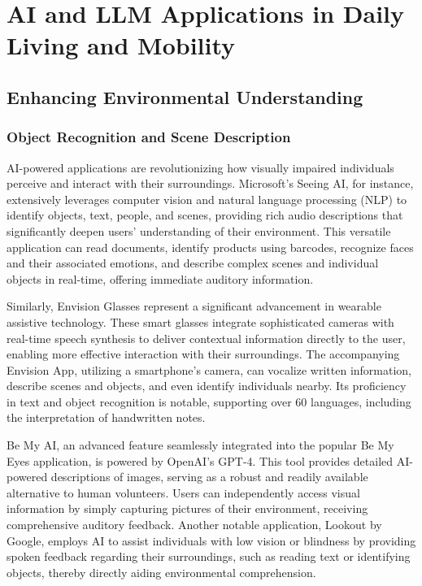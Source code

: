 \section{AI and LLM Applications in Daily Living and Mobility}
\label{sec:ai-llm-applications-daily-living}

\subsection{Enhancing Environmental Understanding}
\label{subsec:enhancing-environmental-understanding}

\subsubsection{Object Recognition and Scene Description}
\label{subsubsec:object-recognition-scene-description}

AI-powered applications are revolutionizing how visually impaired individuals perceive and interact with their surroundings. Microsoft's Seeing AI, for instance, extensively leverages computer vision and natural language processing (NLP) to identify objects, text, people, and scenes, providing rich audio descriptions that significantly deepen users' understanding of their environment. This versatile application can read documents, identify products using barcodes, recognize faces and their associated emotions, and describe complex scenes and individual objects in real-time, offering immediate auditory information. \cite{arxiv2503, accessiblepharmacy2024, msseeingai}

Similarly, Envision Glasses represent a significant advancement in wearable assistive technology. These smart glasses integrate sophisticated cameras with real-time speech synthesis to deliver contextual information directly to the user, enabling more effective interaction with their surroundings. The accompanying Envision App, utilizing a smartphone's camera, can vocalize written information, describe scenes and objects, and even identify individuals nearby. Its proficiency in text and object recognition is notable, supporting over 60 languages, including the interpretation of handwritten notes. \cite{arxiv2503, accessiblepharmacy2024, envision}

Be My AI, an advanced feature seamlessly integrated into the popular Be My Eyes application, is powered by OpenAI's GPT-4. This tool provides detailed AI-powered descriptions of images, serving as a robust and readily available alternative to human volunteers. Users can independently access visual information by simply capturing pictures of their environment, receiving comprehensive auditory feedback. \cite{accessiblepharmacy2024, maitraye2024} Another notable application, Lookout by Google, employs AI to assist individuals with low vision or blindness by providing spoken feedback regarding their surroundings, such as reading text or identifying objects, thereby directly aiding environmental comprehension. \cite{accessiblepharmacy2024}

